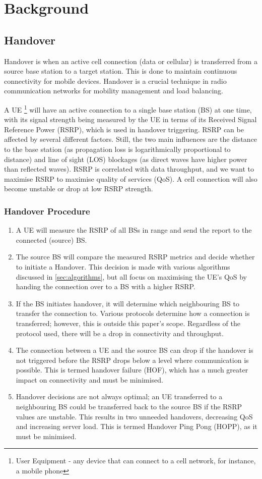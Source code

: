 \chapter{Background}
\section{Handover}
Handover is when an active cell connection (data or cellular) is transferred from a source base station to a target station. This is done to maintain continuous connectivity for mobile devices. Handover is a crucial technique in radio communication networks for mobility management and load balancing.

A UE \footnote{User Equipment - any device that can connect to a cell network, for instance, a mobile phone} will have an active connection to a single base station (BS) at one time, with its signal strength being measured by the UE in terms of its Received Signal Reference Power (RSRP), which is used in handover triggering. RSRP can be affected by several different factors. Still, the two main influences are the distance to the base station (as propagation loss is logarithmically proportional to distance) and line of sight (LOS) blockages (as direct waves have higher power than reflected waves). 
RSRP is correlated with data throughput, and we want to maximise RSRP to maximise quality of services (QoS). A cell connection will also become unstable or drop at low RSRP strength.

\subsection{Handover Procedure}
\begin{enumerate}
    \item A UE will measure the RSRP of all BSs in range and send the report to the connected (source) BS.
    \item The source BS will compare the measured RSRP metrics and decide whether to initiate a Handover. This decision is made with various algorithms discussed in \ref{sec:algorithms}, but all focus on maximising the UE's QoS by handing the connection over to a BS with a higher RSRP.
    \item If the BS initiates handover, it will determine which neighbouring BS to transfer the connection to. Various protocols determine how a connection is transferred; however, this is outside this paper's scope. Regardless of the protocol used, there will be a drop in connectivity and throughput.
    \item The connection between a UE and the source BS can drop if the handover is not triggered before the RSRP drops below a level where communication is possible. This is termed handover failure (HOF), which has a much greater impact on connectivity and must be minimised.
    \item Handover decisions are not always optimal; an UE transferred to a neighbouring BS could be transferred back to the source BS if the RSRP values are unstable. This results in two unneeded handovers, decreasing QoS and increasing server load. This is termed Handover Ping Pong (HOPP), as it must be minimised.
\end{enumerate}


